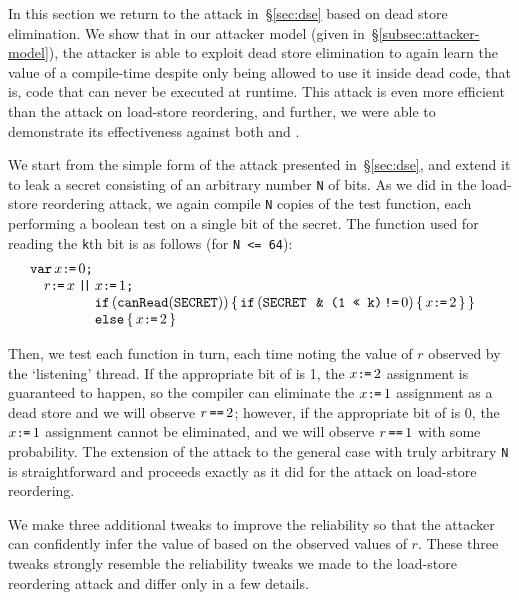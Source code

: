 In this section we return to the attack in~\S\ref{sec:dse} based on
dead store elimination.
We show that in our attacker model (given in~\S\ref{subsec:attacker-model}),
the attacker is able to exploit dead
store elimination to again learn the value of a compile-time {\SEC}
despite only being allowed to use it inside dead code, that is, code that can
never be executed at runtime.
This attack is even more efficient than the attack on load-store reordering,
and further, we were able to demonstrate its effectiveness against both
{\GCC} and {\CLANG}.

We start from the simple form of the attack presented in~\S\ref{sec:dse},
and extend it to leak a secret consisting of an
arbitrary number \verb|N| of bits.
As we did in the load-store reordering attack, we again compile \verb|N| copies
of the test function, each performing a boolean test on a single bit of the
secret.
The function used for reading the \verb|k|th bit is as follows (for
\verb|N <= 64|):
\[\begin{array}[t]{@{}l}
  \VAR x\GETS0\SEMI\\\quad
    r\GETS x
  \PAR\begin{array}[t]{@{}l}
    x\GETS 1\SEMI\\
    \IF(\CANREAD(\SEC))\THEN \IF(\SEC\,\texttt{ \& (1 << k)}\NOTEQ0)\THEN x\GETS 2\FI
    \brELSE x\GETS 2\FI
\end{array}\end{array}\]
Then, we test each function in turn, each time noting the value of $r$
observed by the `listening' thread.
If the appropriate bit of {\SEC} is 1, the $x\texttt{:}\mkern-1mu\texttt{=}\, 2$ assignment is
guaranteed to happen, so the compiler can eliminate the $x \texttt{:}\mkern-1mu\texttt{=}\, 1$
assignment as a dead store and we will observe $r\,\texttt{==}\, 2$; however, if the
appropriate bit of {\SEC} is 0, the $x\texttt{:}\mkern-1mu\texttt{=}\, 1$ assignment cannot be
eliminated, and we will observe $r\,\texttt{==}\, 1$ with some probability.
The extension of the attack to the general case with truly arbitrary \verb|N|
is straightforward and proceeds exactly as it did for the attack on
load-store reordering.

We make three additional tweaks to improve the reliability so that the attacker
can confidently infer the value of {\SEC} based on the observed values
of $r$.
These three tweaks strongly resemble the reliability tweaks we made to the
load-store reordering attack and differ only in a few details.

